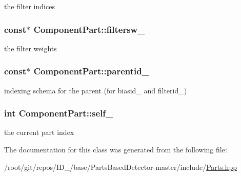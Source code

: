 the filter indices 

\hypertarget{classComponentPart_a301c8633b1e8db3f30436c0ba0fc140d}{
\subsubsection[{filtersw\-\_\-}]{ const$\ast$ {\bf \-Component\-Part\-::filtersw\-\_\-}}}\label{classComponentPart_a301c8633b1e8db3f30436c0ba0fc140d}


the filter weights 

\hypertarget{classComponentPart_a3c75a843f04e4b3d56e4461f8ef803fa}{
\subsubsection[{parentid\-\_\-}]{ const$\ast$ {\bf \-Component\-Part\-::parentid\-\_\-}}}\label{classComponentPart_a3c75a843f04e4b3d56e4461f8ef803fa}


indexing schema for the parent (for biasid\-\_\- and filterid\-\_\-) 

\hypertarget{classComponentPart_a814391cfc1e60223f270d06e3bf2f8b6}{
\subsubsection[{self\-\_\-}]{\setlength{\rightskip}{0pt plus 5cm}int {\bf \-Component\-Part\-::self\-\_\-}}}\label{classComponentPart_a814391cfc1e60223f270d06e3bf2f8b6}


the current part index 



\-The documentation for this class was generated from the following file\-:\begin{DoxyCompactItemize}
\item 
/root/git/repos/\-I\-D\-\_/base/\-Parts\-Based\-Detector-\/master/include/\hyperlink{Parts_8hpp}{\-Parts.\-hpp}\end{DoxyCompactItemize}
